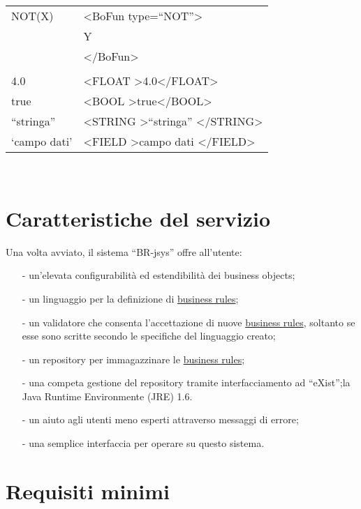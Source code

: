 \begin{table}[htbp]
\begin{tabular}{||p{3cm}||p{6.5cm}||}
\hline
NOT(X) & \textless BoFun type=``NOT''\textgreater \\
&  Y \\
& \textless /BoFun\textgreater \\ \hline
& \\ \hline 
4.0 & \textless FLOAT \textgreater4.0\textless /FLOAT\textgreater \\ \hline
true & \textless BOOL \textgreater true\textless /BOOL\textgreater \\ \hline
``stringa'' & \textless STRING \textgreater ``stringa'' \textless /STRING\textgreater \\ \hline
`campo dati' &\textless FIELD \textgreater campo dati \textless /FIELD\textgreater \\ \hline
\end{tabular} \\
\end{table}

\section{Caratteristiche del servizio}
Una volta avviato, il sistema ``BR-jsys'' offre all'utente:
\begin{itemize}
\item[-] un'elevata configurabilit\`a ed estendibilit\`a dei business objects;
\item[-] un linguaggio per la definizione di \underline{business rules};
\item[-] un validatore che consenta l'accettazione di nuove \underline{business rules}, soltanto se esse sono scritte secondo le specifiche del linguaggio creato;
\item[-] un repository per immagazzinare le \underline{business rules};
\item[-] una competa gestione del repository tramite interfacciamento ad ``eXist'';la Java Runtime Environmente (JRE) 1.6.
\item[-] un aiuto agli utenti meno esperti attraverso  messaggi di errore;
\item[-] una semplice interfaccia per operare su questo sistema.
\end{itemize}
\section{Requisiti minimi}
